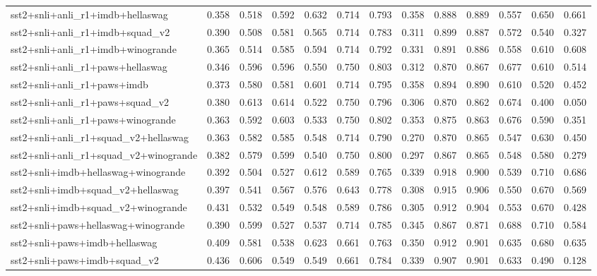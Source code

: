 \begin{table}[t]
\begin{tabular}{lrrrrrrrrrrrr}
    sst2+snli+anli\_r1+imdb+hellaswag & 0.358 & 0.518 & 0.592 & 0.632 & 0.714 & 0.793 & 0.358 & 0.888 & 0.889 & 0.557 & 0.650 & 0.661 \\
    sst2+snli+anli\_r1+imdb+squad\_v2 & 0.390 & 0.508 & 0.581 & 0.565 & 0.714 & 0.783 & 0.311 & 0.899 & 0.887 & 0.572 & 0.540 & 0.327 \\
    sst2+snli+anli\_r1+imdb+winogrande & 0.365 & 0.514 & 0.585 & 0.594 & 0.714 & 0.792 & 0.331 & 0.891 & 0.886 & 0.558 & 0.610 & 0.608 \\
    sst2+snli+anli\_r1+paws+hellaswag & 0.346 & 0.596 & 0.596 & 0.550 & 0.750 & 0.803 & 0.312 & 0.870 & 0.867 & 0.677 & 0.610 & 0.514 \\
    sst2+snli+anli\_r1+paws+imdb & 0.373 & 0.580 & 0.581 & 0.601 & 0.714 & 0.795 & 0.358 & 0.894 & 0.890 & 0.610 & 0.520 & 0.452 \\
    sst2+snli+anli\_r1+paws+squad\_v2 & 0.380 & 0.613 & 0.614 & 0.522 & 0.750 & 0.796 & 0.306 & 0.870 & 0.862 & 0.674 & 0.400 & 0.050 \\
    sst2+snli+anli\_r1+paws+winogrande & 0.363 & 0.592 & 0.603 & 0.533 & 0.750 & 0.802 & 0.353 & 0.875 & 0.863 & 0.676 & 0.590 & 0.351 \\
    sst2+snli+anli\_r1+squad\_v2+hellaswag & 0.363 & 0.582 & 0.585 & 0.548 & 0.714 & 0.790 & 0.270 & 0.870 & 0.865 & 0.547 & 0.630 & 0.450 \\
    sst2+snli+anli\_r1+squad\_v2+winogrande & 0.382 & 0.579 & 0.599 & 0.540 & 0.750 & 0.800 & 0.297 & 0.867 & 0.865 & 0.548 & 0.580 & 0.279 \\
    sst2+snli+imdb+hellaswag+winogrande & 0.392 & 0.504 & 0.527 & 0.612 & 0.589 & 0.765 & 0.339 & 0.918 & 0.900 & 0.539 & 0.710 & 0.686 \\
    sst2+snli+imdb+squad\_v2+hellaswag & 0.397 & 0.541 & 0.567 & 0.576 & 0.643 & 0.778 & 0.308 & 0.915 & 0.906 & 0.550 & 0.670 & 0.569 \\
    sst2+snli+imdb+squad\_v2+winogrande & 0.431 & 0.532 & 0.549 & 0.548 & 0.589 & 0.786 & 0.305 & 0.912 & 0.904 & 0.553 & 0.670 & 0.428 \\
    sst2+snli+paws+hellaswag+winogrande & 0.390 & 0.599 & 0.527 & 0.537 & 0.714 & 0.785 & 0.345 & 0.867 & 0.871 & 0.688 & 0.710 & 0.584 \\
    sst2+snli+paws+imdb+hellaswag & 0.409 & 0.581 & 0.538 & 0.623 & 0.661 & 0.763 & 0.350 & 0.912 & 0.901 & 0.635 & 0.680 & 0.635 \\
    sst2+snli+paws+imdb+squad\_v2 & 0.436 & 0.606 & 0.549 & 0.549 & 0.661 & 0.784 & 0.339 & 0.907 & 0.901 & 0.633 & 0.490 & 0.128 \\

\end{tabular}
\end{table}
